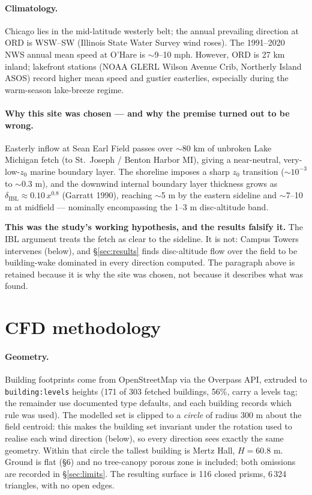 \documentclass[11pt,letterpaper]{article}
\begin{document}
\paragraph{Climatology.} Chicago lies in the mid-latitude westerly belt; the annual prevailing direction at ORD is WSW--SW (Illinois State Water Survey wind roses). The 1991--2020 NWS annual mean speed at O'Hare is $\sim$9--10 mph. However, ORD is 27 km inland; lakefront stations (NOAA GLERL Wilson Avenue Crib, Northerly Island ASOS) record higher mean speed and gustier easterlies, especially during the warm-season lake-breeze regime.

\paragraph{Why this site was chosen --- and why the premise turned out to be
wrong.} Easterly inflow at Sean Earl Field passes over $\sim$80 km of unbroken
Lake Michigan fetch (to St.\ Joseph / Benton Harbor MI), giving a near-neutral,
very-low-$z_0$ marine boundary layer. The shoreline imposes a sharp $z_0$
transition ($\sim 10^{-3}$ to $\sim$0.3 m), and the downwind internal boundary
layer thickness grows as $\delta_{\text{IBL}} \approx 0.10\,x^{0.8}$ (Garratt
1990), reaching $\sim$5 m by the eastern sideline and $\sim$7--10 m at midfield
--- nominally encompassing the 1--3 m disc-altitude band.

\textbf{This was the study's working hypothesis, and the results falsify it.}
The IBL argument treats the fetch as clear to the sideline. It is not: Campus
Towers intervenes (below), and \S\ref{sec:results} finds disc-altitude flow over
the field to be building-wake dominated in every direction computed. The
paragraph above is retained because it is why the site was chosen, not because
it describes what was found.

\section{CFD methodology}

\paragraph{Geometry.} Building footprints come from OpenStreetMap via the
Overpass API, extruded to \texttt{building:levels} heights (171 of 303 fetched
buildings, 56\%, carry a levels tag; the remainder use documented type
defaults, and each building records which rule was used). The modelled set is
clipped to a \emph{circle} of radius 300 m about the field centroid: this makes
the building set invariant under the rotation used to realise each wind
direction (below), so every direction sees exactly the same geometry. Within
that circle the tallest building is Mertz Hall, $H = 60.8$ m. Ground is flat
(\S6) and no tree-canopy porous zone is included; both omissions are recorded
in \S\ref{sec:limits}. The resulting surface is 116 closed prisms, 6\,324
triangles, with no open edges.
\end{document}
